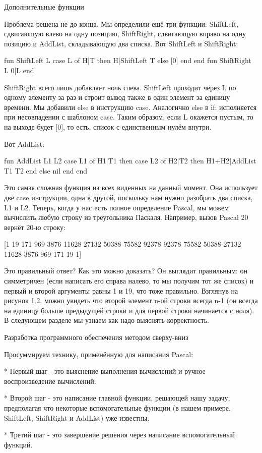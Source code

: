 Дополнительные функции

Проблема решена не до конца. Мы определили ещё три функции: ShiftLeft, сдвигающую влево на одну позицию, ShiftRight, сдвигающую вправо на одну позицию и AddList, складывающую два списка. Вот ShiftLeft и ShiftRight:

fun {ShiftLeft L}
case L of H|T then
H|{ShiftLeft T}
else [0] end
end
fun {ShiftRight L} 0|L end

ShiftRight всего лишь добавляет ноль слева. ShiftLeft проходит через L по одному элементу за раз и строит вывод также в один элемент за единицу времени. Мы добавили else в инструкцию case. Аналогично else в if: исполняется при несовпадении с шаблоном case. Таким образом, если L окажется пустым, то на выходе будет [0], то есть, список с единственным нулём внутри.

Вот AddList:

fun {AddList L1 L2}
case L1 of H1|T1 then
case L2 of H2|T2 then
H1+H2|{AddList T1 T2}
end
else nil end
end

Это самая сложная функция из всех виденных на данный момент. Она использует две case инструкции, одна в другой, поскольку нам нужно разобрать два списка, L1 и L2. Теперь, когда у нас есть полное определение Pascal, мы можем вычислить любую строку из треугольника Паскаля. Например, вызов {Pascal 20} вернёт 20-ю строку:

[1 19 171 969 3876 11628 27132 50388 75582 92378 92378 75582 50388 27132 11628 3876 969 171 19 1]

Это правильный ответ? Как это можно доказать? Он выглядит правильным: он симметричен (если написать его справа налево, то мы получим тот же список) и первый и второй аргументы равны 1 и 19, что тоже правильно. Взглянув на рисунок 1.2, можно увидеть что второй элемент n-ой строки всегда n-1 (он всегда на единицу больше предыдущей строки и для первой строки начинается с ноля). В следующем разделе мы узнаем как надо выяснять корректность.

Разработка программного обеспечения методом сверху-вниз

Просуммируем технику, применённую для написания Pascal:

* Первый шаг - это выяснение выполнения вычислений и ручное воспроизведение вычислений.

* Второй шаг - это написание главной функции, решающей нашу задачу, предполагая что некоторые вспомогательные функции (в нашем примере, ShiftLeft, ShiftRight и AddList) уже известны.

* Третий шаг - это завершение решения через написание вспомогательный функций.

